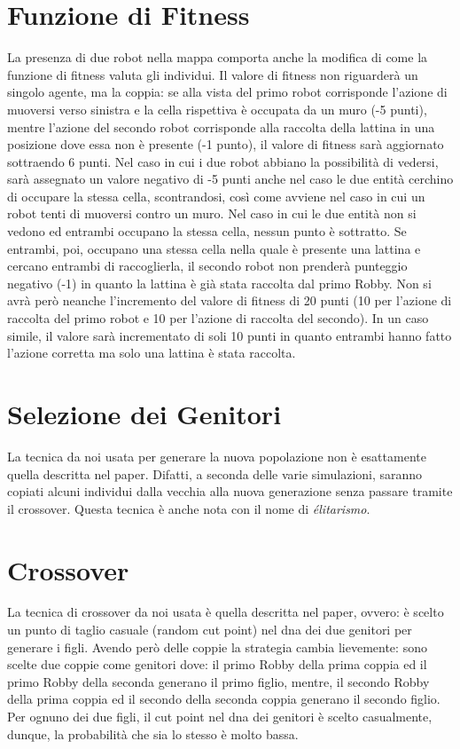 \section{Funzione di Fitness}
La presenza di due robot nella mappa comporta anche la modifica di come la
funzione di fitness valuta gli individui. Il valore di fitness non riguarderà un
singolo agente, ma la coppia: se alla vista del primo robot corrisponde l'azione
di muoversi verso sinistra e la cella rispettiva è occupata da un muro (-5
punti), mentre l'azione del secondo robot corrisponde alla raccolta della
lattina in una posizione dove essa non è presente (-1 punto), il valore di
fitness sarà aggiornato sottraendo 6 punti.\newline
Nel caso in cui i due robot abbiano la possibilità di vedersi, sarà assegnato un
valore negativo di -5 punti anche nel caso le due entità cerchino di occupare la
stessa cella, scontrandosi, così come avviene nel caso in cui un robot tenti di
muoversi contro un muro.\newline
Nel caso in cui le due entità non si vedono ed entrambi occupano la stessa
cella, nessun punto è sottratto. Se entrambi, poi, occupano una stessa cella
nella quale è presente una lattina e cercano entrambi di raccoglierla, il
secondo robot non prenderà punteggio negativo (-1) in quanto la lattina è già
stata raccolta dal primo Robby. Non si avrà però neanche l'incremento del valore
di fitness di 20 punti (10 per l'azione di raccolta del primo robot e 10 per
l'azione di raccolta del secondo). In un caso simile, il valore sarà
incrementato di soli 10 punti in quanto entrambi hanno fatto l'azione corretta
ma solo una lattina è stata raccolta.

\section{Selezione dei Genitori}
La tecnica da noi usata per generare la nuova popolazione non è esattamente
quella descritta nel paper. Difatti, a seconda delle varie simulazioni, saranno
copiati alcuni individui dalla vecchia alla nuova generazione senza passare
tramite il crossover. Questa tecnica è anche nota con il nome di
\textit{élitarismo}.

\section{Crossover}
La tecnica di crossover da noi usata è quella descritta nel paper, ovvero: è
scelto un punto di taglio casuale (random cut point) nel dna dei due genitori
per generare i figli.\newline
Avendo però delle coppie la strategia cambia lievemente: sono scelte due coppie
come genitori dove: il primo Robby della prima coppia ed il primo Robby della
seconda generano il primo figlio, mentre, il secondo Robby della prima coppia ed
il secondo della seconda coppia generano il secondo figlio. Per ognuno dei due
figli, il cut point nel dna dei genitori è scelto casualmente, dunque, la
probabilità che sia lo stesso è molto bassa.

